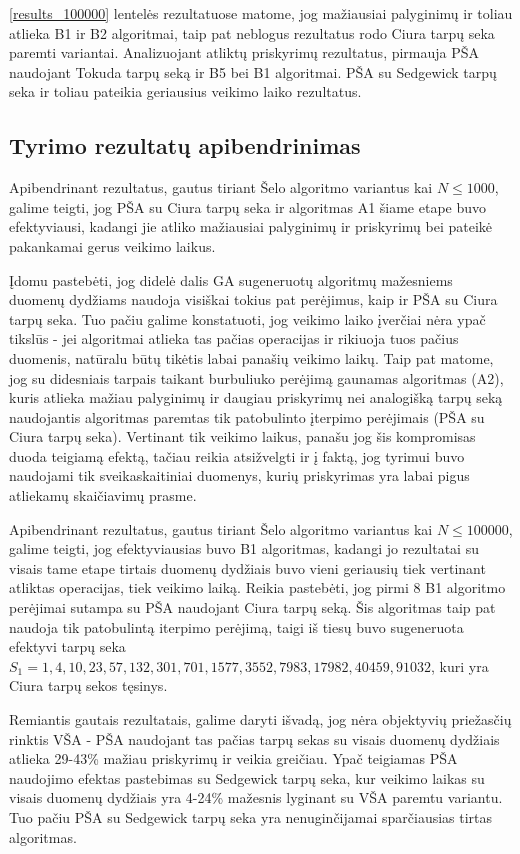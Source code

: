 \documentclass{VUMIFInfKursinis}
\begin{document}
\ref{results_100000} lentelės rezultatuose matome, jog
mažiausiai palyginimų ir toliau atlieka B1 ir B2 algoritmai, taip pat neblogus rezultatus rodo Ciura tarpų seka paremti variantai.
Analizuojant atliktų priskyrimų rezultatus, pirmauja PŠA naudojant Tokuda tarpų seką ir B5 bei B1 algoritmai.
PŠA su Sedgewick tarpų seka ir toliau pateikia geriausius veikimo laiko rezultatus.

\subsection{Tyrimo rezultatų apibendrinimas}

Apibendrinant rezultatus, gautus tiriant Šelo algoritmo variantus kai $N \leq 1000$,
galime teigti, jog PŠA su Ciura tarpų seka ir algoritmas A1 šiame etape buvo efektyviausi,
kadangi jie atliko mažiausiai palyginimų ir priskyrimų bei pateikė pakankamai gerus veikimo laikus.

Įdomu pastebėti, jog didelė dalis GA sugeneruotų algoritmų mažesniems duomenų dydžiams naudoja visiškai tokius pat perėjimus,
kaip ir PŠA su Ciura tarpų seka. Tuo pačiu galime konstatuoti, jog veikimo laiko įverčiai nėra ypač tikslūs -
jei algoritmai atlieka tas pačias operacijas ir rikiuoja tuos pačius duomenis, natūralu būtų tikėtis labai panašių veikimo laikų. 
Taip pat matome, jog su didesniais tarpais taikant burbuliuko perėjimą gaunamas algoritmas (A2), kuris atlieka mažiau palyginimų ir daugiau priskyrimų
nei analogišką tarpų seką naudojantis algoritmas paremtas tik patobulinto įterpimo perėjimais (PŠA su Ciura tarpų seka).
Vertinant tik veikimo laikus, panašu jog šis kompromisas duoda teigiamą efektą, tačiau reikia atsižvelgti ir į faktą, jog tyrimui
buvo naudojami tik sveikaskaitiniai duomenys, kurių priskyrimas yra labai pigus atliekamų skaičiavimų prasme. 

Apibendrinant rezultatus, gautus tiriant Šelo algoritmo variantus kai $N \leq 100000$,
galime teigti, jog efektyviausias buvo B1 algoritmas, kadangi jo rezultatai su visais tame etape tirtais duomenų dydžiais buvo vieni geriausių tiek vertinant atliktas operacijas, tiek veikimo laiką.
Reikia pastebėti, jog pirmi 8 B1 algoritmo perėjimai sutampa su PŠA naudojant Ciura tarpų seką.
Šis algoritmas taip pat naudoja tik patobulintą iterpimo perėjimą, taigi iš tiesų buvo sugeneruota efektyvi tarpų seka ${S_1 = 1, 4, 10, 23, 57, 132, 301, 701, 1577, 3552, 7983, 17982, 40459, 91032}$,
kuri yra Ciura tarpų sekos tęsinys.


Remiantis gautais rezultatais, galime daryti išvadą, jog nėra objektyvių priežasčių rinktis VŠA - 
PŠA naudojant tas pačias tarpų sekas su visais duomenų dydžiais atlieka 29-43\% mažiau priskyrimų ir veikia greičiau. 
Ypač teigiamas PŠA naudojimo efektas pastebimas su Sedgewick tarpų seka, kur veikimo laikas su visais duomenų dydžiais yra 4-24\% mažesnis lyginant su VŠA paremtu variantu.  
Tuo pačiu PŠA su Sedgewick tarpų seka yra nenuginčijamai sparčiausias tirtas algoritmas.
\end{document}
